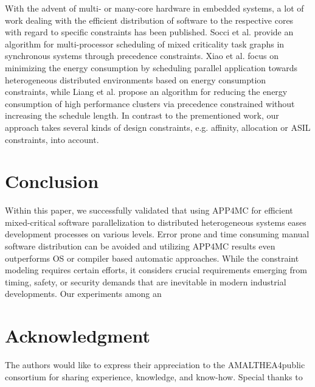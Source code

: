 \documentclass [a4paper,final,conference,10pt]{IDAACS}
\begin{document}
With the advent of multi- or many-core hardware in embedded systems, a lot of work dealing with the efficient distribution of software to the respective cores with regard to specific constraints has been published. Socci et al. \cite{Socci2015} provide an algorithm for multi-processor scheduling of mixed criticality task graphs in synchronous systems through precedence constraints. 
Xiao et al. \cite{Xiao2016} focus on minimizing the energy consumption by scheduling parallel application towards heterogeneous distributed environments based on energy consumption constraints, while Liang et al. \cite{LiXi13} propose an algorithm for reducing the energy consumption of high performance clusters via precedence
constrained without increasing the schedule length. In contrast to the prementioned work, our approach takes several kinds of design constraints, e.g. affinity, allocation or ASIL constraints, into account.

 \cite{Kritikakou2014} 

\section{Conclusion}
\label{sec:concl}
Within this paper, we successfully validated that using APP4MC for efficient mixed-critical software parallelization to distributed heterogeneous systems eases development processes on various levels. Error prone and time consuming manual software distribution can be avoided and utilizing APP4MC results even outperforms OS or compiler based automatic approaches. While the constraint modeling requires certain efforts, it considers crucial requirements emerging from timing, safety, or security demands that are inevitable in modern industrial developments. Our experiments among an 


\section*{Acknowledgment}
The authors would like to express their appreciation to the AMALTHEA4public consortium for sharing experience, knowledge, and know-how. Special thanks to 


\end{document}
